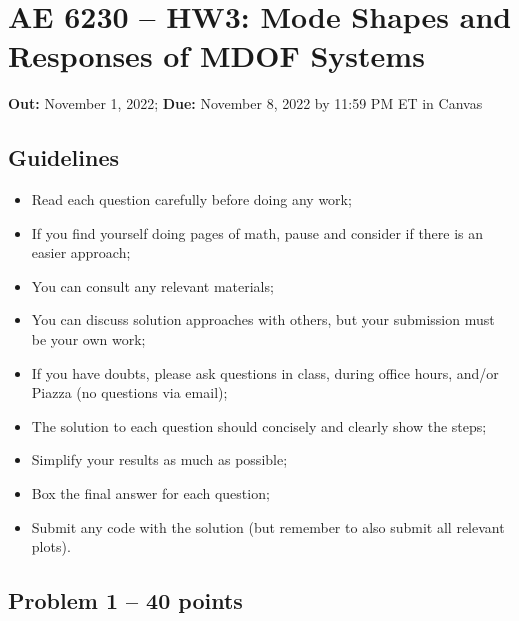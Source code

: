 \documentclass[11pt,a4paper]{article}
\begin{document}
	
	

\section*{AE 6230 -- HW3: Mode Shapes and Responses of MDOF Systems}

\textbf{Out:} November 1, 2022; \textbf{Due:} November 8, 2022 by 11:59 PM ET in Canvas \\

\subsection*{Guidelines}

\begin{itemize}

    \item Read each question carefully before doing any work;

    \item If you find yourself doing pages of math, pause and consider if there is an easier approach;
	
    \item You can consult any relevant materials;
 
    \item You can discuss solution approaches with others, but your submission must be your own work;

    \item If you have doubts, please ask questions in class, during office hours, and/or Piazza (no questions via email);
	
    \item The solution to each question should concisely and clearly show the steps;

    \item Simplify your results as much as possible;

    \item Box the final answer for each question;        

    \item Submit any code with the solution (but remember to also submit all relevant plots).
	
\end{itemize}

\clearpage 

\subsection*{Problem 1 -- 40 points}
\end{document}
